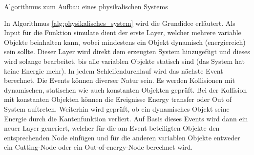 \begin{algorithm}[H]
    \DontPrintSemicolon
    \;
    \caption{Algorithmus zum Aufbau eines physikalischen Systems}
    \label{alg:physikalisches_system}
\end{algorithm}
In Algorithmus \ref{alg:physikalisches_system} wird die Grundidee erläutert. Als Input für die Funktion \glqq simulate\grqq{}
dient der erste Layer, welcher mehrere variable Objekte beinhalten kann, wobei mindestens ein Objekt dynamisch (energiereich)
sein sollte. Dieser Layer wird direkt dem erzeugten System hinzugefügt und dieses wird solange bearbeitet, bis alle variablen
Objekte statisch sind (das System hat keine Energie mehr). In jedem Schleifendurchlauf wird das nächste Event berechnet.
Die Events können diverser Natur sein. Es werden Kollisionen mit dynamischen, statischen wie auch konstanten Objekten
geprüft. Bei der Kollision mit konstanten Objekten können die Ereignisse \glqq Energy transfer\grqq{} oder \glqq Out of
System\grqq{} auftreten. Weiterhin wird geprüft, ob ein dynamisches Objekt seine Energie durch die Kantenfunktion
verliert. Auf Basis dieses Events wird dann ein neuer Layer generiert, welcher für die am Event beteiligten Objekte
den entsprechenden Node einfügen und für die anderen variablen Objekte entweder ein \glqq Cutting-Node\grqq{} oder ein
\glqq Out-of-energy-Node\grqq{} berechnet wird.